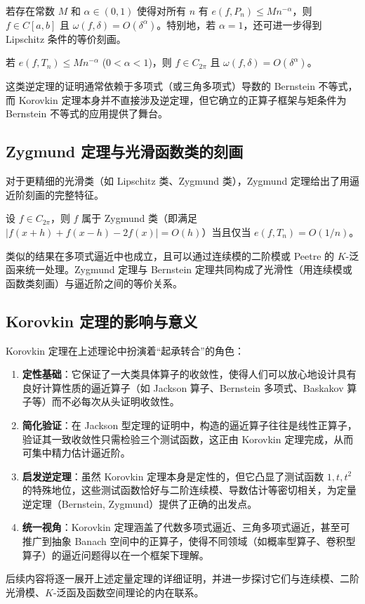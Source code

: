 \begin{theorem}
若存在常数 $M$ 和 $\alpha\in(0,1)$ 使得对所有 $n$ 有 $e(f,P_n)\le M n^{-\alpha}$，则 $f\in C[a,b]$ 且 $\omega(f,\delta)=O(\delta^\alpha)$。特别地，若 $\alpha=1$，还可进一步得到 Lipschitz 条件的等价刻画。
\end{theorem}

\begin{theorem}
若 $e(f,T_n)\le M n^{-\alpha}$ ($0<\alpha<1$)，则 $f\in C_{2\pi}$ 且 $\omega(f,\delta)=O(\delta^\alpha)$。
\end{theorem}

这类逆定理的证明通常依赖于多项式（或三角多项式）导数的 Bernstein 不等式，而 Korovkin 定理本身并不直接涉及逆定理，但它确立的正算子框架与矩条件为 Bernstein 不等式的应用提供了舞台。

\subsection{Zygmund 定理与光滑函数类的刻画}
对于更精细的光滑类（如 Lipschitz 类、Zygmund 类），Zygmund 定理给出了用逼近阶刻画的完整特征。

\begin{theorem}[Zygmund]
设 $f\in C_{2\pi}$，则 $f$ 属于 Zygmund 类（即满足 $|f(x+h)+f(x-h)-2f(x)|=O(h)$）当且仅当 $e(f,T_n)=O(1/n)$。
\end{theorem}

类似的结果在多项式逼近中也成立，且可以通过连续模的二阶模或 Peetre 的 $K$-泛函来统一处理。Zygmund 定理与 Bernstein 定理共同构成了光滑性（用连续模或函数类刻画）与逼近阶之间的等价关系。

\subsection{Korovkin 定理的影响与意义}
Korovkin 定理在上述理论中扮演着“起承转合”的角色：
\begin{enumerate}
    \item \textbf{定性基础}：它保证了一大类具体算子的收敛性，使得人们可以放心地设计具有良好计算性质的逼近算子（如 Jackson 算子、Bernstein 多项式、Baskakov 算子等）而不必每次从头证明收敛性。
    \item \textbf{简化验证}：在 Jackson 型定理的证明中，构造的逼近算子往往是线性正算子，验证其一致收敛性只需检验三个测试函数，这正由 Korovkin 定理完成，从而可集中精力估计逼近阶。
    \item \textbf{启发逆定理}：虽然 Korovkin 定理本身是定性的，但它凸显了测试函数 $1,t,t^2$ 的特殊地位，这些测试函数恰好与二阶连续模、导数估计等密切相关，为定量逆定理（Bernstein, Zygmund）提供了正确的出发点。
    \item \textbf{统一视角}：Korovkin 定理涵盖了代数多项式逼近、三角多项式逼近，甚至可推广到抽象 Banach 空间中的正算子，使得不同领域（如概率型算子、卷积型算子）的逼近问题得以在一个框架下理解。
\end{enumerate}

后续内容将逐一展开上述定量定理的详细证明，并进一步探讨它们与连续模、二阶光滑模、$K$-泛函及函数空间理论的内在联系。